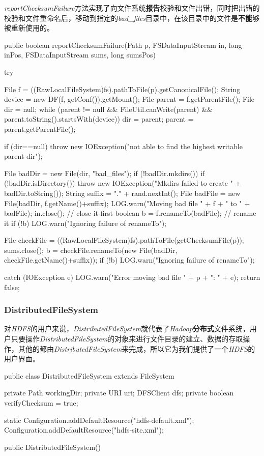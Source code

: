         \textit{reportChecksumFailure}方法实现了向文件系统\textbf{报告}校验和文件出错，同时把出错的校验和文件重命名后，移动到指定的\textit{bad\_files}目录中，在该目录中的文件是\textbf{不能}够被重新使用的。\\
        \begin{java}[caption=reportChecksumFailure]
public boolean reportChecksumFailure(Path p, FSDataInputStream in, long inPos, FSDataInputStream sums, long sumsPos) {
    try {
        File f = ((RawLocalFileSystem)fs).pathToFile(p).getCanonicalFile();
        String device = new DF(f, getConf()).getMount();
        File parent = f.getParentFile();
        File dir = null;
        while (parent != null && FileUtil.canWrite(parent) && parent.toString().startsWith(device)) {
            dir = parent;
            parent = parent.getParentFile();
        }

        if (dir==null) {
            throw new IOException("not able to find the highest writable parent dir");
        }
            
        File badDir = new File(dir, "bad_files");
        if (!badDir.mkdirs()) {
            if (!badDir.isDirectory()) {
            throw new IOException("Mkdirs failed to create " + badDir.toString());
            }
        }
        String suffix = "." + rand.nextInt();
        File badFile = new File(badDir, f.getName()+suffix);
        LOG.warn("Moving bad file " + f + " to " + badFile);
        in.close();                               // close it first
        boolean b = f.renameTo(badFile);                      // rename it
        if (!b) {
            LOG.warn("Ignoring failure of renameTo");
        }

        File checkFile = ((RawLocalFileSystem)fs).pathToFile(getChecksumFile(p));
        sums.close();
        b = checkFile.renameTo(new File(badDir, checkFile.getName()+suffix));
        if (!b) {
            LOG.warn("Ignoring failure of renameTo");
            }
    } catch (IOException e) {
        LOG.warn("Error moving bad file " + p + ": " + e);
    }
    return false;
}
        \end{java}

    \subsubsection{DistributedFileSystem}
        对\textit{HDFS}的用户来说，\textit{DistributedFileSystem}就代表了\textit{Hadoop}\textbf{分布式}文件系统，用户只要操作\textit{DistributedFileSystem}的对象来进行文件目录的建立、数据的存取操作，其他的都由\textit{DistributedFileSystem}来完成，所以它为我们提供了一个\textit{HDFS}的用户界面。
        \begin{java}[caption=DistributedFileSystem]
public class DistributedFileSystem extends FileSystem {  
    private Path workingDir;  
    private URI uri;  
    DFSClient dfs;  
    private boolean verifyChecksum = true;  
        
    static{  
        Configuration.addDefaultResource("hdfs-default.xml");  
        Configuration.addDefaultResource("hdfs-site.xml");  
    }  
    
    public DistributedFileSystem() {  
    }  
}  
        \end{java}

